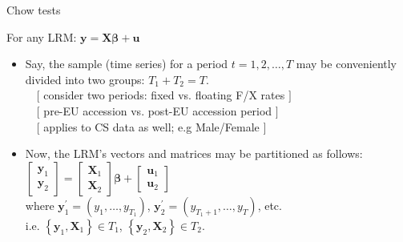 \documentclass{beamer}
\begin{document}
\begin{frame}{Chow tests}

For any LRM: $\bm{y} = \bm{X\beta}+\bm{u}$
\vspace{0.3cm}

\begin{itemize}

\item Say, the sample (time series) for a period $t=1,2, \dots, T$ may be conveniently divided into two groups: $T_1 + T_2 = T$.  \\ 
~~$[$ consider two periods: fixed vs. floating F/X rates $]$ \\ 
~~$[$ pre-EU accession vs. post-EU accession period $]$ \\
~~$[$ applies to CS data as well; e.g Male/Female $]$
\vspace{0.3cm}
\item Now, the LRM's vectors and matrices may be partitioned as follows: \\
\vspace{0.3cm}
$ \begin{bmatrix} \bm{y}_1 \\ \bm{y}_2 \end{bmatrix} = 
\begin{bmatrix} \bm{X}_1 \\ \bm{X}_2 \end{bmatrix} \bm{\beta} +
\begin{bmatrix} \bm{u}_1 \\ \bm{u}_2 \end{bmatrix}$ \\
\vspace{0.2cm}
where $\bm{y}_1^\prime = (y_1, \dots , y_{T_1})$, 
$\bm{y}_2^\prime = (y_{T_1+1}, \dots , y_{T})$, etc. 
\\ i.e. $\left\lbrace\bm{y}_1, \bm{X}_1 \right\rbrace \in T_1$,  
$\left\lbrace\bm{y}_2, \bm{X}_2 \right\rbrace \in T_2$. 

\end{itemize}

\end{frame}



\end{document}
